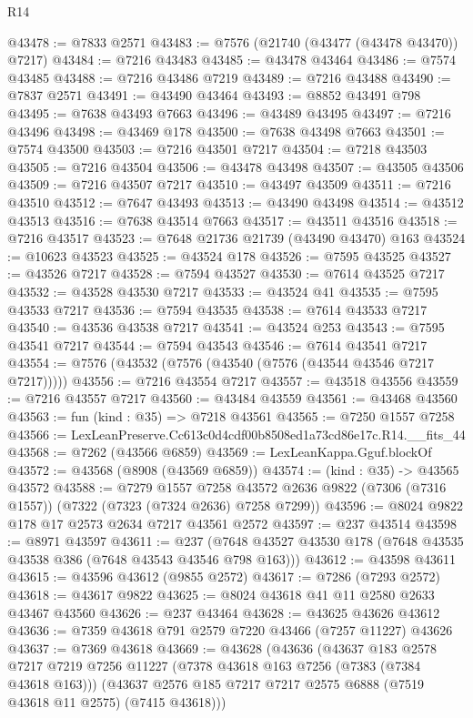 \begin{lexlean}{R14}
\begin{coremodule}
@43478 := @7833 @2571
@43483 := @7576 (@21740 (@43477 (@43478 @43470)) @7217)
@43484 := @7216 @43483
@43485 := @43478 @43464
@43486 := @7574 @43485
@43488 := @7216 @43486 @7219
@43489 := @7216 @43488
@43490 := @7837 @2571
@43491 := @43490 @43464
@43493 := @8852 @43491 @798
@43495 := @7638 @43493 @7663
@43496 := @43489 @43495
@43497 := @7216 @43496
@43498 := @43469 @178
@43500 := @7638 @43498 @7663
@43501 := @7574 @43500
@43503 := @7216 @43501 @7217
@43504 := @7218 @43503
@43505 := @7216 @43504
@43506 := @43478 @43498
@43507 := @43505 @43506
@43509 := @7216 @43507 @7217
@43510 := @43497 @43509
@43511 := @7216 @43510
@43512 := @7647 @43493
@43513 := @43490 @43498
@43514 := @43512 @43513
@43516 := @7638 @43514 @7663
@43517 := @43511 @43516
@43518 := @7216 @43517
@43523 := @7648 @21736 @21739 (@43490 @43470) @163
@43524 := @10623 @43523
@43525 := @43524 @178
@43526 := @7595 @43525
@43527 := @43526 @7217
@43528 := @7594 @43527
@43530 := @7614 @43525 @7217
@43532 := @43528 @43530 @7217
@43533 := @43524 @41
@43535 := @7595 @43533 @7217
@43536 := @7594 @43535
@43538 := @7614 @43533 @7217
@43540 := @43536 @43538 @7217
@43541 := @43524 @253
@43543 := @7595 @43541 @7217
@43544 := @7594 @43543
@43546 := @7614 @43541 @7217
@43554 := @7576 (@43532 (@7576 (@43540 (@7576 (@43544 @43546 @7217 @7217)))))
@43556 := @7216 @43554 @7217
@43557 := @43518 @43556
@43559 := @7216 @43557 @7217
@43560 := @43484 @43559
@43561 := @43468 @43560
@43563 := fun (kind : @35) => @7218 @43561
@43565 := @7250 @1557 @7258
@43566 := LexLeanPreserve.Cc613c0d4cdf00b8508ed1a73cd86e17c.R14.__fits_44
@43568 := @7262 (@43566 @6859)
@43569 := LexLeanKappa.Gguf.blockOf
@43572 := @43568 (@8908 (@43569 @6859))
@43574 := (kind : @35) -> @43565 @43572
@43588 := @7279
    @1557
    @7258
    @43572
    @2636
    @9822
    (@7306 (@7316 @1557))
    (@7322 (@7323 (@7324 @2636) @7258 @7299))
@43596 := @8024 @9822 @178 @17 @2573 @2634 @7217 @43561 @2572
@43597 := @237 @43514
@43598 := @8971 @43597
@43611 := @237 (@7648 @43527 @43530 @178 (@7648 @43535 @43538 @386 (@7648 @43543 @43546 @798 @163)))
@43612 := @43598 @43611
@43615 := @43596 @43612 (@9855 @2572)
@43617 := @7286 (@7293 @2572)
@43618 := @43617 @9822
@43625 := @8024 @43618 @41 @11 @2580 @2633 @43467 @43560
@43626 := @237 @43464
@43628 := @43625 @43626 @43612
@43636 := @7359 @43618 @791 @2579 @7220 @43466 (@7257 @11227) @43626
@43637 := @7369 @43618
@43669 := @43628
    (@43636
      (@43637
        @183
        @2578
        @7217
        @7219
        @7256
        @11227
        (@7378 @43618 @163 @7256 (@7383 (@7384 @43618 @163)))
        (@43637 @2576 @185 @7217 @7217 @2575 @6888 (@7519 @43618 @11 @2575) (@7415 @43618)))

\end{coremodule}
\end{lexlean}
